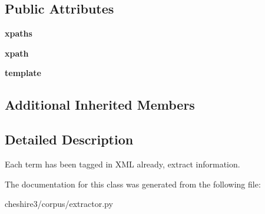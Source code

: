 \subsection*{Public Attributes}
\begin{DoxyCompactItemize}
\item 
\hypertarget{classcheshire3_1_1corpus_1_1extractor_1_1_template_term_extractor_a90ff45dd8f6938edc0ee5e520f99c078}{{\bfseries xpaths}}\label{classcheshire3_1_1corpus_1_1extractor_1_1_template_term_extractor_a90ff45dd8f6938edc0ee5e520f99c078}

\item 
\hypertarget{classcheshire3_1_1corpus_1_1extractor_1_1_template_term_extractor_a7ad18aed96b388d7c16891e1c42d2d0d}{{\bfseries xpath}}\label{classcheshire3_1_1corpus_1_1extractor_1_1_template_term_extractor_a7ad18aed96b388d7c16891e1c42d2d0d}

\item 
\hypertarget{classcheshire3_1_1corpus_1_1extractor_1_1_template_term_extractor_aa2a085f6aaec850af08773df70ad0fdf}{{\bfseries template}}\label{classcheshire3_1_1corpus_1_1extractor_1_1_template_term_extractor_aa2a085f6aaec850af08773df70ad0fdf}

\end{DoxyCompactItemize}
\subsection*{Additional Inherited Members}


\subsection{Detailed Description}
\begin{DoxyVerb}Each term has been tagged in XML already, extract information.\end{DoxyVerb}
 

The documentation for this class was generated from the following file\-:\begin{DoxyCompactItemize}
\item 
cheshire3/corpus/extractor.\-py\end{DoxyCompactItemize}
